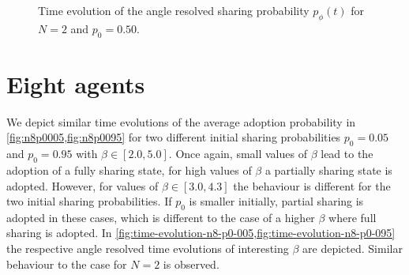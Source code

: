 \documentclass[aps,pra,showpacs,preprintnumbers,amsmath,amssymb,nofootinbib]{revtex4-2}
\begin{document}
\begin{figure}
{
        }
        \caption{Time evolution of the angle resolved sharing probability $p_\phi (t)$ for $N = 2$ and $p_0 = 0.50$.}
        \label{fig:time-evolution-n2}
    \end{figure}

    \section{Eight agents}

    We depict similar time evolutions of the average adoption probability in \cref{fig:n8p0005,fig:n8p0095} for two different initial sharing probabilities $p_0 = 0.05$ and $p_0 = 0.95$ with $\beta \in [2.0, 5.0]$.
    Once again, small values of $\beta$ lead to the adoption of a fully sharing state, for high values of $\beta$ a partially sharing state is adopted.
    However, for values of $\beta \in [3.0, 4.3]$ the behaviour is different for the two initial sharing probabilities. 
    If $p_0$ is smaller initially, partial sharing is adopted in these cases, which is different to the case of a higher $\beta$ where full sharing is adopted.
    In \cref{fig:time-evolution-n8-p0-005,fig:time-evolution-n8-p0-095} the respective angle resolved time evolutions of interesting $\beta$ are depicted.
    Similar behaviour to the case for $N =2$ is observed.
\end{document}

